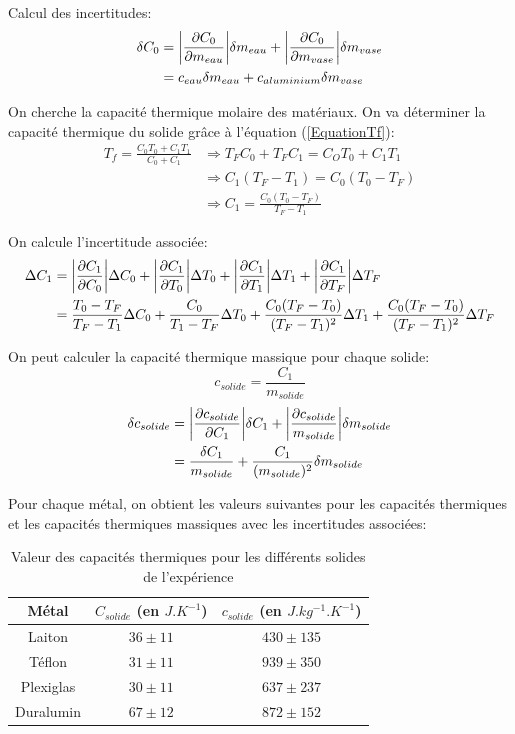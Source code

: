 \documentclass[12pt]{article}
\begin{document}
Calcul des incertitudes:
\begin{align*}
\delta C_0&= \abs{\frac{\partial C_0}{\partial m_{eau}}} \delta m_{eau} + \abs{\frac{\partial C_0}{\partial m_{vase}}} \delta m_{vase}\\
&=c_{eau}\delta m_{eau}+c_{aluminium}\delta m_{vase}
\end{align*}

On cherche la capacité thermique molaire des matériaux. On va déterminer la capacité thermique du solide grâce à l'équation (\ref{EquationTf}):
\begin{align*}
T_f=\frac{C_0T_0+C_1T_1}{C_0+C_1} &\Rightarrow T_FC_0+T_FC_1=C_OT_0+C_1T_1 \\
&\Rightarrow C_1(T_F-T_1)=C_0(T_0-T_F) \\
&\Rightarrow C_1=\frac{C_0(T_0-T_F)}{T_F-T_1}
\end{align*}

On calcule l'incertitude associée:
\begin{align*}
\Delta C_1 &= \abs{\frac{\partial C_1}{\partial C_0}} \Delta C_0 + \abs{\frac{\partial C_1}{\partial T_0}} \Delta T_0 + \abs{\frac{\partial C_1}{\partial T_1}} \Delta T_1 + \abs{\frac{\partial C_1}{\partial T_F}} \Delta T_F \\
&= \frac{T_0-T_F}{T_F-T_1}\Delta C_0 + \frac{C_0}{T_1-T_F} \Delta T_0 + \frac{C_0(T_F - T_0)}{(T_F-T_1)^2}\Delta T_1 + \frac{C_0(T_F - T_0)}{(T_F-T_1)^2}\Delta T_F
\end{align*}

On peut calculer la capacité thermique massique pour chaque solide:
\begin{equation}
c_{solide}=\frac{C_1}{m_{solide}}
\end{equation}
\begin{align*}
\delta c_{solide}&=\abs{\frac{\partial c_{solide}}{\partial C_1}}\delta C_1 + \abs{\frac{\partial c_{solide}}{m_{solide}}}\delta m_{solide} \\
&=\frac{\delta C_1}{m_{solide}}+ \frac{C_1}{(m_{solide})^2}\delta m_{solide}
\end{align*}


Pour chaque métal, on obtient les valeurs suivantes pour les capacités thermiques et les capacités thermiques massiques avec les incertitudes associées:

\begin{table}[h!]
	\begin{center}
		\begin{tabular}{|c|c|c|}
			\hline
			Métal & $C_{solide}$ (en $J.K^{-1}$) & $c_{solide}$ (en $J.kg^{-1}.K^{-1}$)\\ \hline
			Laiton & $36 \pm 11$ & $430 \pm 135$ \\
			Téflon & $31 \pm 11$ & $939 \pm 350$ \\
			Plexiglas & $30 \pm 11$ & $637 \pm 237$ \\
			Duralumin & $67 \pm 12$ & $872 \pm 152$ \\ \hline
		\end{tabular}
	\end{center}
	\caption{Valeur des capacités thermiques pour les différents solides de l'expérience}
\end{table}
\end{document}
